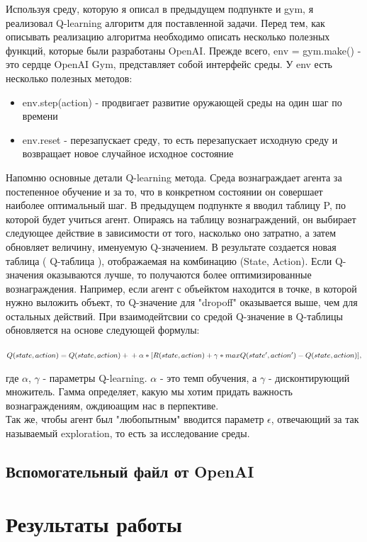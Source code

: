 \documentclass[12pt, a4paper]{report}
\theoremstyle{definition}
\theoremstyle{plain}
\theoremstyle{remark}
\theoremstyle{remark}
\theoremstyle{definition}
\begin{document}
Используя среду, которую я описал в предыдущем подпункте и gym, я реализовал Q-learning алгоритм для поставленной задачи. Перед тем, как описывать реализацию алгоритма необходимо описать несколько полезных функций, которые были разработаны OpenAI. Прежде всего, env = gym.make() - это сердце OpenAI Gym, представляет собой интерфейс среды. У env есть несколько полезных методов:
\begin{itemize}
    \item env.step(action) - продвигает развитие оружающей среды на один шаг по времени
    \item env.reset - перезапускает среду, то есть перезапускает исходную среду и возвращает новое случайное исходное состояние
\end{itemize}
Напомню основные детали Q-learning метода. Среда вознаграждает агента за постепенное обучение и за то, что в конкретном состоянии он совершает наиболее оптимальный шаг. В предыдущем подпункте я вводил таблицу P, по которой будет учиться агент. Опираясь на таблицу вознаграждений, он выбирает следующее действие в зависимости от того, насколько оно затратно, а затем обновляет величину, именуемую Q-значением. В результате создается новая таблица ( Q-таблица ), отображаемая на комбинацию (State, Action). Если Q-значения оказываются лучше, то получаются более оптимизированные вознаграждения. Например, если агент с объейктом находится в точке, в которой нужно выложить объект, то Q-значение для "dropoff" оказывается выше, чем для остальных действий. При взаимодейтсвии со средой Q-значение в Q-таблицы обновляется на основе следующей формулы:
\begin{center}
    $
    Q(state, action) = Q(state,action) + \\
    + \alpha*[R(state, action) + \gamma*maxQ(state', action') - Q(state,action)],
    $
\end{center}
где $\alpha$, $\gamma$ - параметры Q-learning. $\alpha$ - это темп обучения, а $\gamma$ - дисконтирующий множитель. Гамма определяет, какую мы хотим придать важность вознаграждениям, ождиюащим нас в перпективе.\\

Так же, чтобы агент был "любопытным" вводится параметр $\epsilon$, отвечающий за так называемый exploration, то есть за исследование среды.
\subsection{Вспомогательный файл от OpenAI}

\section{Результаты работы}
\end{document}
